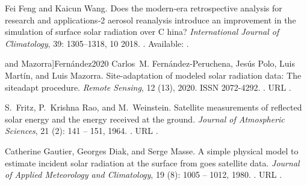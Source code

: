 \documentclass[letterpaper,12pt, twoside]{report}
\providecommand{\DIFdeltex}[1]{{\protect\color{red} \scriptsize #1}} %
\providecommand{\DIFdel}[1]{\texorpdfstring{\DIFdeltex{#1}}{}} %
\begin{document}
\DIFdel{Fei Feng and Kaicun Wang.
}%
\DIFdel{Does the modern‐era retrospective analysis for research and
  applications‐2 aerosol reanalysis introduce an improvement in the
  simulation of surface solar radiation over }%
\DIFdel{C}%
\DIFdel{hina?
}%
\DIFdel{\emph{International Journal of Climatology}, 39:}%
\DIFdel{1305--1318,
  10 2018.
}%
\DIFdel{.
}%
\DIFdel{Available: }%
\DIFdel{.
}%

  and Mazorra]{Fernández2020}
\DIFdel{Carlos~M. Fernández-Peruchena, Jesús Polo, Luis Martín, and Luis Mazorra.
}%
\DIFdel{Site-adaptation of modeled solar radiation data: The siteadapt
  procedure.
}%
\DIFdel{\emph{Remote Sensing}, 12}%
\DIFdel{(13), 2020.
}%
\DIFdel{ISSN 2072-4292.
}%
\DIFdel{.
}%
\DIFdel{URL }%
\DIFdel{.
}%

\DIFdel{S.~Fritz, P.~Krishna Rao, and M.~Weinstein.
}%
\DIFdel{Satellite measurements of reflected solar energy and the energy
  received at the ground.
}%
\DIFdel{\emph{Journal of Atmospheric Sciences}, 21}%
\DIFdel{(2):}%
\DIFdel{141
  -- 151, 1964.
}%
\DIFdel{.
}%
\DIFdel{URL
  }%
\DIFdel{.
}%

\DIFdel{Catherine Gautier, Georges Diak, and Serge Masse.
}%
\DIFdel{A simple physical model to estimate incident solar radiation at the
  surface from goes satellite data.
}%
\DIFdel{\emph{Journal of Applied Meteorology and Climatology}, 19}%
\DIFdel{(8):}%
\DIFdel{1005 -- 1012, 1980.
}%
\DIFdel{.
}%
\DIFdel{URL
  }%
\DIFdel{.
}%
\end{document}
